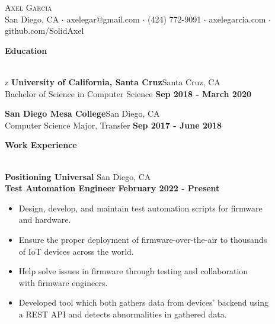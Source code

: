 \documentclass[a4paper]{article}
\newcommand{\lineunder} {
    \vspace*{-8pt} \\
    \hspace*{-18pt} \hrulefill \\
}
\newcommand{\header} [1] {
    {\hspace*{-18pt}\vspace*{6pt}\LARGE \textbf{#1}}
    \vspace*{-6pt} \lineunder
}
\begin{document}
\vspace*{-40pt}

    

\vspace*{-10pt}
\begin{center}
	{\Huge \scshape {Axel Garcia}}\\[2mm]
	San Diego, CA $\cdot$ axelegar@gmail.com $\cdot$ (424) 772-9091 $\cdot$ axelegarcia.com $\cdot$ github.com/SolidAxel\\
\end{center}

\header{Education}
\vspace{1mm}

z
\textbf{University of California, Santa Cruz}\hfill Santa Cruz, CA\\
\quad Bachelor of Science in Computer Science \hfill \textbf{Sep 2018 - March 2020}\\
\vspace{2mm}

\textbf{San Diego Mesa College}\hfill San Diego, CA\\
\quad Computer Science Major, Transfer \hfill \textbf{Sep 2017 - June 2018}\\
\vspace{2mm}

\header{Work Experience}
\vspace{1mm}

\textbf{Positioning Universal} \hfill San Diego, CA\\
\hspace{4mm} \textbf{Test Automation Engineer} \hfill \textbf{February 2022 - Present}\\
\vspace{-2mm}
\begin{itemize} \itemsep -2pt
	\item Design, develop, and maintain test automation scripts for firmware\\ and hardware.
	\item Ensure the proper deployment of firmware-over-the-air to thousands \\of IoT devices across the world.
	\item Help solve issues in firmware through testing and collaboration\\ with firmware engineers.
	\item Developed tool which both gathers data from devices' backend using\\a REST API and detects abnormalities in gathered data.
\end{itemize}
\end{document}
